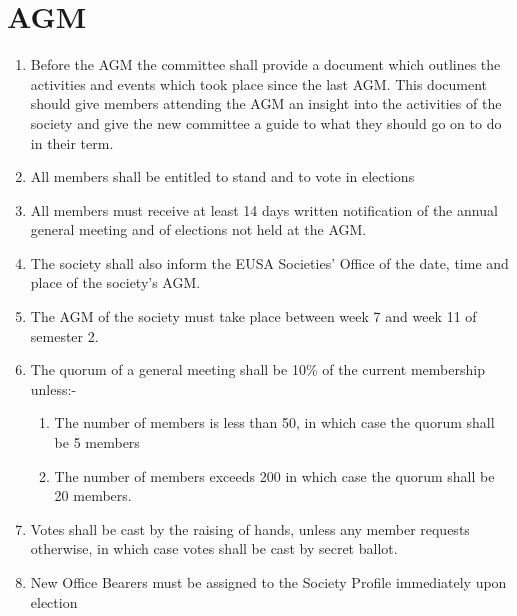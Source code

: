 \documentclass[a4paper]{article}
\begin{document}





\newpage{}
\section{AGM}

\begin{enumerate}

  \item Before the AGM the committee shall provide a document which outlines
    the activities and events which took place since the last AGM. This document
    should give members attending the AGM an insight into the activities
    of the society and give the new committee a guide to what they
    should go on to do in their term.

  \item All members shall be entitled to stand and to vote in elections

  \item All members must receive at least 14 days written notification of the annual
    general meeting and of elections not held at the AGM.

  \item The society shall also inform the EUSA Societies’ Office of the date, time and
    place of the society’s AGM.

  \item The AGM of the society must take place between week 7 and week 11 of
    semester 2.

  \item The quorum of a general meeting shall be 10\% of the current membership
    unless:-
    \begin{enumerate}
      \item The number of members is less than 50, in which case the quorum
        shall be 5 members
      \item The number of members exceeds 200 in which case the quorum shall
        be 20 members.
    \end{enumerate}

  \item Votes shall be cast by the raising of hands, unless any member requests
    otherwise, in which case votes shall be cast by secret ballot.

  \item New Office Bearers must be assigned to the Society Profile immediately
    upon election


\end{enumerate}
\end{document}
